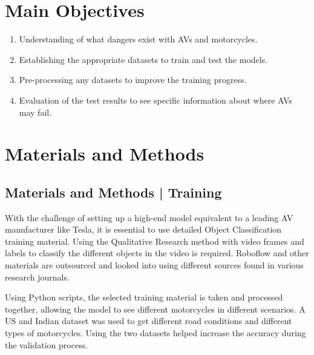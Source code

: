 \documentclass[a0,portrait]{a0poster}
\begin{document}
\begin{multicols}{2}

	\color{DarkSlateGray} %

	\section*{Main Objectives}
		\begin{enumerate}
			\item Understanding of what dangers exist with AVs and motorcycles.
			\item Establishing the appropriate datasets to train and test the models.
			\item Pre-processing any datasets to improve the training progress.
			\item Evaluation of the test results to see specific information about where AVs may fail.
		\end{enumerate}


	\section*{Materials and Methods}
		\subsection*{Materials and Methods | Training}
			With the challenge of setting up a high-end model equivalent to a leading AV manufacturer like Tesla, it is essential to use detailed Object Classification training material. Using the Qualitative Research method with video frames and labels to classify the different objects in the video is required. Roboflow and other materials are outsourced and looked into using different sources found in various research journals.

			Using Python scripts, the selected training material is taken and processed together, allowing the model to see different motorcycles in different scenarios. A US and Indian dataset was used to get different road conditions and different types of motorcycles. Using the two datasets helped increase the accuracy during the validation process.


\end{multicols}
\end{document}
